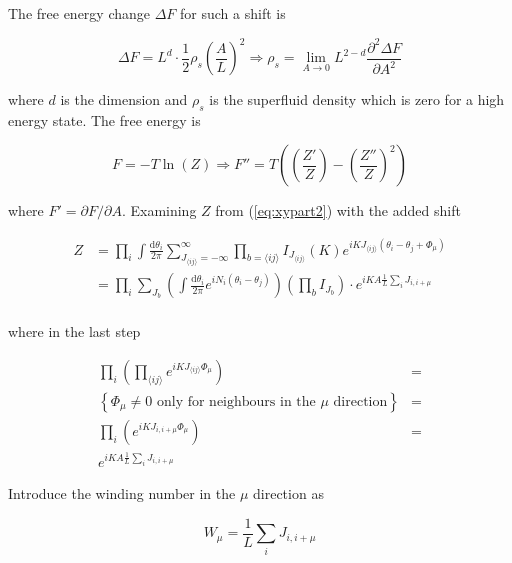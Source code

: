 The free energy change $\Delta F$ for such a shift is

\begin{equation}
    \Delta F = L^d \cdot \frac{1}{2} \rho_s \left( \frac{A}{L} \right)^2 \Rightarrow \rho_s = \lim_{A \to 0} L^{2 - d}\frac{\partial^2 \Delta F}{\partial A^2}
\end{equation}

where $d$ is the dimension and $\rho_s$ is the superfluid density which is zero for a high energy state. The free energy is

\begin{equation}
F = - T \ln(Z) \Rightarrow F'' = T \left(\left(\frac{Z'}{Z}\right) - \left( \frac{Z''}{Z} \right)^2 \right)
\label{eq:xyfreeenergy}
\end{equation}

where $F' = \partial F / \partial A$. Examining $Z$ from (\ref{eq:xypart2}) with the added shift

\begin{align}
    Z &= \prod_i \int \frac{\mathrm d \theta_i}{2 \pi} \sum_{J_{\langle ij \rangle} = -\infty}^{\infty} \prod_{b = \langle ij \rangle} I_{J_{\langle ij \rangle}} ( K ) e^{iK J_{\langle ij \rangle} (\theta_i - \theta_j + \Phi_\mu)} \\
%
    & = \prod_i \sum_{J_b} \left ( \int \frac{\mathrm d \theta_i}{2 \pi} e^{i N_i (\theta_i - \theta_j)} \right ) \left ( \prod_b I_{J_b} \right ) \cdot e^{i K A \frac{1}{L} \sum_i J_{i, i+\mu}} \\
\label{eq:xypart3}
\end{align}

where in the last step

\begin{align}
    \prod_i \left (\prod_{\langle ij \rangle} e^{iK J_{\langle ij \rangle} \Phi_\mu} \right) &= \\
%
    \left\{ \text{$\Phi_\mu \neq 0$ only for neighbours in the $\mu$ direction} \right \} &= \\
%
    \prod_i \left ( e^{iK J_{i, i+\mu} \Phi_\mu} \right ) &= \\
%
    e^{iKA \frac{1}{L} \sum_i J_{i, i+\mu}}
\end{align}

Introduce the winding number in the $\mu$ direction as

\begin{equation}
    W_\mu = \frac{1}{L} \sum_i J_{i, i+\mu}
\label{eq:defwinding}
\end{equation}


